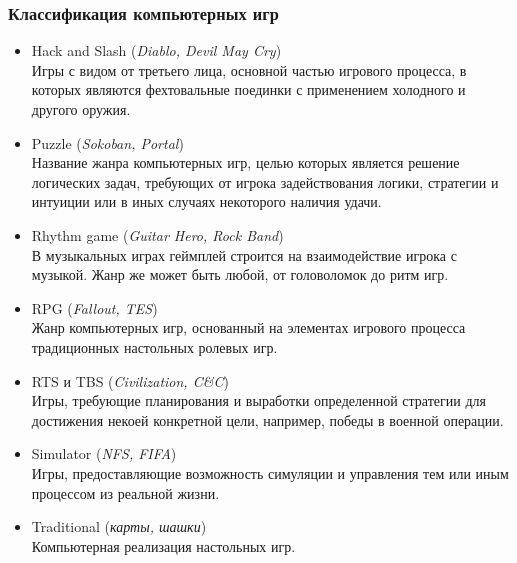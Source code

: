 \begin{frame}
    \frametitle{Классификация компьютерных игр}
    \begin{itemize}
        \item Hack and Slash (\emph{Diablo, Devil May Cry}) \\
            \tiny Игры с видом от третьего лица, основной частью игрового процесса, в которых 
            являются фехтовальные поединки с применением холодного и другого оружия.
        \item \normalsize Puzzle (\emph{Sokoban, Portal}) \\
            \tiny Название жанра компьютерных игр, целью которых является решение логических задач, 
            требующих от игрока задействования логики, стратегии и интуиции или в иных случаях 
            некоторого наличия удачи.
        \item \normalsize Rhythm game (\emph{Guitar Hero, Rock Band}) \\
            \tiny В музыкальных играх геймплей строится на взаимодействие игрока с музыкой. 
            Жанр же может быть любой, от головоломок до ритм игр.
        \item \normalsize RPG (\emph{Fallout, TES}) \\
            \tiny Жанр компьютерных игр, основанный на элементах игрового процесса традиционных 
            настольных ролевых игр.
        \item \normalsize RTS и TBS (\emph{Civilization, C\&C}) \\
            \tiny Игры, требующие планирования и выработки определенной стратегии для достижения 
            некоей конкретной цели, например, победы в военной операции.
        \item \normalsize Simulator (\emph{NFS, FIFA}) \\
            \tiny Игры, предоставляющие возможность симуляции и управления тем или иным процессом 
            из реальной жизни.
        \item \normalsize Traditional (\emph{карты, шашки}) \\
            \tiny Компьютерная реализация настольных игр.
    \end{itemize}
\end{frame}

